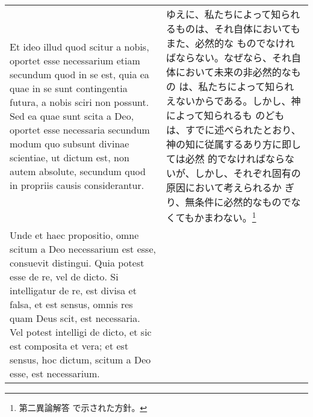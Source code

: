 \documentclass[10pt]{jsarticle} %
\begin{document}
\begin{longtable}{p{21em}p{21em}}
\\

Et ideo illud quod scitur a nobis, oportet esse necessarium etiam
secundum quod in se est, quia ea quae in se sunt contingentia futura,
a nobis sciri non possunt. Sed ea quae sunt scita a Deo, oportet esse
necessaria secundum modum quo subsunt divinae scientiae, ut dictum
est, non autem absolute, secundum quod in propriis causis
considerantur.


&

ゆえに、私たちによって知られるものは、それ自体においてもまた、必然的な
ものでなければならない。なぜなら、それ自体において未来の非必然的なもの
は、私たちによって知られえないからである。しかし、神によって知られるも
のどもは、すでに述べられたとおり、神の知に従属するあり方に即しては必然
的でなければならないが、しかし、それぞれ固有の原因において考えられるか
ぎり、無条件に必然的なものでなくてもかまわない。\footnote{第二異論解答
で示された方針。}

\\

Unde et haec propositio, omne scitum a Deo necessarium est esse,
consuevit distingui. Quia potest esse de re, vel de dicto. Si
intelligatur de re, est divisa et falsa, et est sensus, omnis res quam
Deus scit, est necessaria. Vel potest intelligi de dicto, et sic est
composita et vera; et est sensus, hoc dictum, scitum a Deo esse, est
necessarium.


&


\end{longtable}
\end{document}
